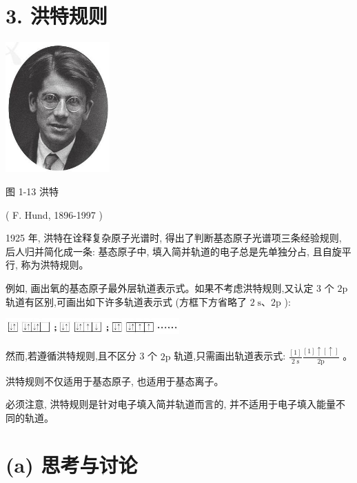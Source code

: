 \documentclass[10pt]{article}
\begin{document}
\section*{3. 洪特规则}

\begin{center}
\includegraphics[max width=0.3\textwidth]{images/0190e026-5a11-7df7-bd27-54d09026ba7a_18_282590.jpg}
\end{center}

图 1-13 洪特

( F. Hund, 1896-1997 )

1925 年, 洪特在诠释复杂原子光谱时, 得出了判断基态原子光谱项三条经验规则, 后人归并简化成一条: 基态原子中, 填入简并轨道的电子总是先单独分占, 且自旋平行, 称为洪特规则。

例如, 画出氧的基态原子最外层轨道表示式。如果不考虑洪特规则,又认定 3 个 \(2\mathrm{p}\) 轨道有区别,可画出如下许多轨道表示式 (方框下方省略了 \(2\mathrm{\;s}\text{、}2\mathrm{p}\) ):

\begin{center}
\includegraphics[max width=0.5\textwidth]{images/0190e026-5a11-7df7-bd27-54d09026ba7a_18_111776.jpg}
\end{center}

然而,若遵循洪特规则,且不区分 3 个 \(2\mathrm{p}\) 轨道,只需画出轨道表示式: \(\frac{\left\lbrack 1\right\rbrack }{2\mathrm{\;s}}\frac{\left\lbrack 1\right\rbrack \uparrow \left\lbrack \uparrow \right\rbrack }{2\mathrm{p}}\) 。

洪特规则不仅适用于基态原子, 也适用于基态离子。

必须注意, 洪特规则是针对电子填入简并轨道而言的, 并不适用于电子填入能量不同的轨道。

\section*{(a) 思考与讨论}
\end{document}
